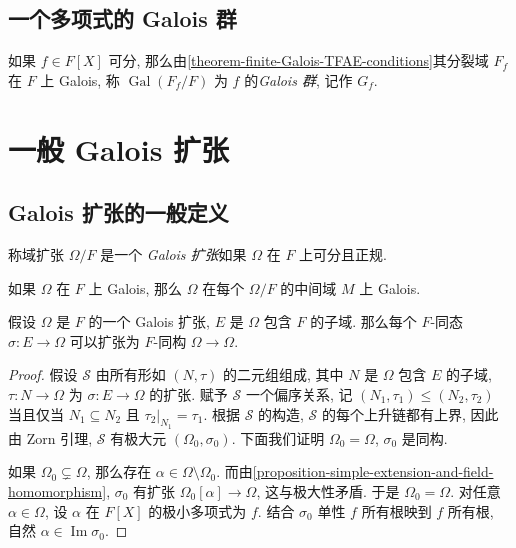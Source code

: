 \subsection{一个多项式的 Galois 群}

如果 \( f \in F[X] \) 可分,
那么由\cref{theorem-finite-Galois-TFAE-conditions}其分裂域 \( F_f \) 在 \( F \)
上 Galois, 称 \( \operatorname{Gal}(F_f/F) \) 为 \( f \) 的\emph{Galois 群},
记作 \( G_f. \)

\section{一般 Galois 扩张}

\subsection{Galois 扩张的一般定义}

称域扩张 \( \Omega/F \) 是一个\emph{ Galois 扩张}如果 \( \Omega \) 在 \( F \)
上可分且正规.

\begin{proposition}
  \label{proposition-Galois-over-middle-field}
  如果 \( \Omega \) 在 \( F \) 上 Galois, 那么 \( \Omega \) 在每个 \( \Omega/F
  \) 的中间域 \( M \) 上 Galois.
\end{proposition}

\begin{proposition}
  \label{proposition-homomorphism-extend-to-Galois-isomorphism}
  假设 \( \Omega \) 是 \( F \) 的一个 Galois 扩张, \( E \) 是 \( \Omega \) 包含
  \( F \) 的子域.
  那么每个 \( F \)-同态 \( \sigma: E \to \Omega \) 可以扩张为 \( F \)-同构 \(
  \Omega \to \Omega \).
\end{proposition}
\begin{proof}
  假设 \( \mathcal{S} \) 由所有形如 \( (N, \tau) \) 的二元组组成, 其中 \( N \)
  是 \( \Omega \) 包含 \( E \) 的子域, \( \tau: N \to \Omega \) 为 \( \sigma: E
  \to \Omega \) 的扩张.
  赋予 \( \mathcal{S} \) 一个偏序关系, 记 \( (N_1, \tau_1) \leq (N_2, \tau_2) \)
  当且仅当 \( N_1 \subseteq N_2 \) 且 \( \left. \tau_2 \right\vert_{N_1} =
    \tau_1 \).
  根据 \( \mathcal{S} \) 的构造, \( \mathcal{S} \) 的每个上升链都有上界, 因此由
  Zorn 引理, \( \mathcal{S} \) 有极大元 \( (\Omega_0, \sigma_0) \).
  下面我们证明 \( \Omega_0 = \Omega \), \( \sigma_0 \) 是同构.

  如果 \( \Omega_0 \subsetneq \Omega \), 那么存在 \( \alpha \in \Omega \setminus
  \Omega_0 \).
  而由\cref{proposition-simple-extension-and-field-homomorphism}, \( \sigma_0 \)
  有扩张 \( \Omega_0[\alpha] \to \Omega \), 这与极大性矛盾.
  于是 \( \Omega_0 = \Omega \).
  对任意 \( \alpha \in \Omega \), 设 \( \alpha \) 在 \( F[X] \) 的极小多项式为
  \( f \).
  结合 \( \sigma_0 \) 单性  \( f \) 所有根映到 \( f \) 所有根, 自然 \(
  \alpha \in \operatorname{Im} \sigma_0 \).
\end{proof}

